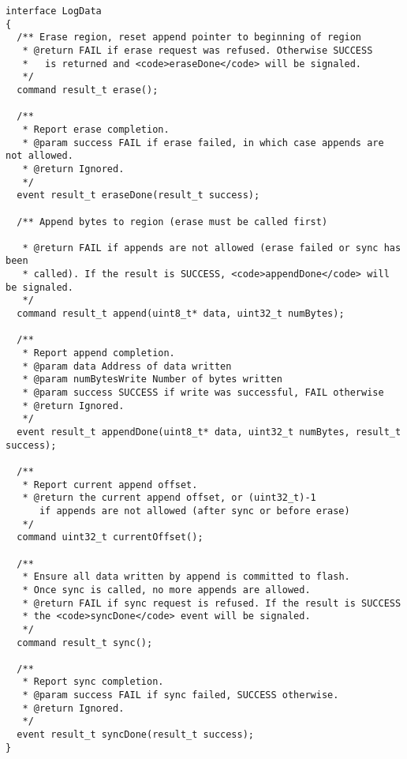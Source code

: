 \documentclass{article}
\begin{document}
\begin{verbatim}
interface LogData
{
  /** Erase region, reset append pointer to beginning of region
   * @return FAIL if erase request was refused. Otherwise SUCCESS
   *   is returned and <code>eraseDone</code> will be signaled.
   */
  command result_t erase();

  /**
   * Report erase completion.
   * @param success FAIL if erase failed, in which case appends are not allowed.
   * @return Ignored.
   */
  event result_t eraseDone(result_t success);

  /** Append bytes to region (erase must be called first)

   * @return FAIL if appends are not allowed (erase failed or sync has been
   * called). If the result is SUCCESS, <code>appendDone</code> will be signaled.
   */
  command result_t append(uint8_t* data, uint32_t numBytes);

  /**
   * Report append completion.
   * @param data Address of data written
   * @param numBytesWrite Number of bytes written
   * @param success SUCCESS if write was successful, FAIL otherwise
   * @return Ignored.
   */
  event result_t appendDone(uint8_t* data, uint32_t numBytes, result_t success);

  /**
   * Report current append offset.
   * @return the current append offset, or (uint32_t)-1
      if appends are not allowed (after sync or before erase)
   */
  command uint32_t currentOffset();

  /** 
   * Ensure all data written by append is committed to flash.
   * Once sync is called, no more appends are allowed.
   * @return FAIL if sync request is refused. If the result is SUCCESS
   * the <code>syncDone</code> event will be signaled.
   */
  command result_t sync();

  /**
   * Report sync completion.
   * @param success FAIL if sync failed, SUCCESS otherwise.
   * @return Ignored.
   */
  event result_t syncDone(result_t success);
}

\end{verbatim}
\end{document}
